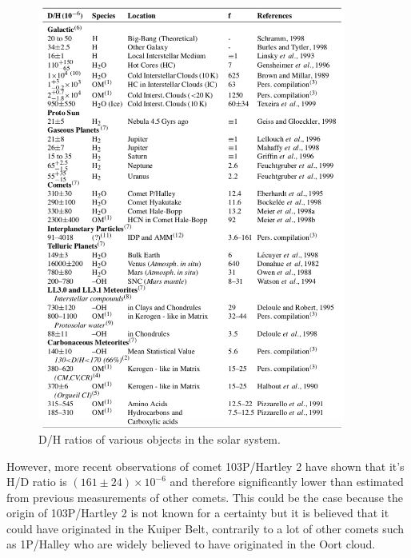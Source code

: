 
\begin{figure}
	\centering
	\includegraphics[width=0.9\textwidth]{figures/D_H_ratio_solar_system}
	\caption{D/H ratios of various objects in the solar system.  \cite{SolSystemDH_Robert}}
	\label{fig::D_H_ratio_solar_system}
\end{figure}

However, more recent observations of comet 103P/Hartley 2 have shown that it's H/D ratio is $(161 \pm 24) \times 10^{-6}$ and therefore significantly lower than estimated from previous measurements of other comets. This could be the case because the origin of 103P/Hartley 2 is not known for a certainty but it is believed that it could have originated in the Kuiper Belt, contrarily to a lot of other comets such as 1P/Halley who are widely believed to have originated in the Oort cloud. \cite{water_Hartley2_nature}


